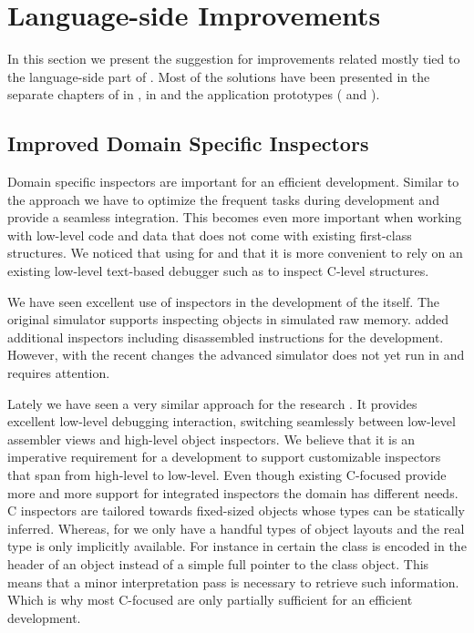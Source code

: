 \section{Language-side Improvements}
In this section we present the suggestion for improvements related mostly tied to the language-side part of \B.
Most of the solutions have been presented in the separate chapters of \B in , \NB \FFI in  and the \B application prototypes ( and ).

\subsection{Improved Domain Specific Inspectors}
Domain specific inspectors are important for an efficient development.
Similar to the \JIT approach we have to optimize the frequent tasks during development and provide a seamless integration.
This becomes even more important when working with low-level code and data that does not come with existing first-class structures.
We noticed that using \B for \NBJ and \WF that it is more convenient to rely on an existing low-level text-based debugger such as  to inspect C-level structures.

We have seen excellent use of inspectors in the \VM development of the \Cog \VM itself.
The original simulator supports inspecting objects in simulated raw memory.
\Cog added additional inspectors including disassembled instructions for the \JIT development.
However, with the recent changes the advanced simulator does not yet run in \PH and requires attention.

Lately we have seen a very similar approach for the \Maxine research \VM \cite{Wimm13a}.
It provides excellent low-level debugging interaction, switching seamlessly between low-level assembler views and high-level object inspectors.
We believe that it is an imperative requirement for a \VM development \IDE to support customizable inspectors that span from high-level to low-level.
Even though existing C-focused \IDEs provide more and more support for integrated inspectors the \VM domain has different needs.
C inspectors are tailored towards fixed-sized objects whose types can be statically inferred.
Whereas, for \VMs we only have a handful types of object layouts and the real type is only implicitly available.
For instance in certain \VMs the class is encoded in the header of an object instead of a simple full pointer to the class object.
This means that a minor interpretation pass is necessary to retrieve such information.
Which is why most C-focused \IDEs are only partially sufficient for an efficient \VM development.


